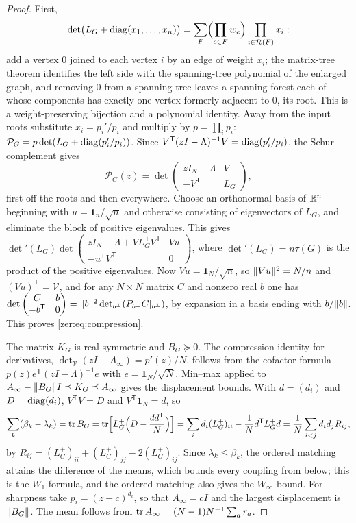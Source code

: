\begin{proof}
First,
\begin{equation}\label{zer:eq:forestdet}
 \det\bigl(L_G+\operatorname{diag}(x_1,\dots,x_n)\bigr)=\sum_F\Bigl(\prod_{e\in F}w_e\Bigr)\prod_{i\in\mathcal R(F)}x_i :
\end{equation}
add a vertex $0$ joined to each vertex $i$ by an edge of weight $x_i$; the matrix-tree theorem
identifies the left side with the spanning-tree polynomial of the enlarged graph, and removing $0$
from a spanning tree leaves a spanning forest each of whose components has exactly one vertex
formerly adjacent to $0$, its root. This is a weight-preserving bijection and a polynomial identity.
Away from the input roots substitute $x_i=p_i'/p_i$ and multiply by $p=\prod_ip_i$:
$\mathcal P_G=p\det(L_G+\operatorname{diag}(p_i'/p_i))$. Since $V^{\mathsf T}(zI-\Lambda)^{-1}V=\operatorname{diag}(p_i'/p_i)$,
the Schur complement gives
\[
 \mathcal P_G(z)=\det\begin{pmatrix}zI_N-\Lambda&V\\-V^{\mathsf T}&L_G\end{pmatrix},
\]
first off the roots and then everywhere. Choose an orthonormal basis of $\mathbb{R}^n$ beginning with
$u=\mathbf 1_n/\sqrt n$ and otherwise consisting of eigenvectors of $L_G$, and eliminate the block of
positive eigenvalues. This gives $\det{}'(L_G)\det\begin{pmatrix}zI_N-\Lambda+VL_G^+V^{\mathsf T}&Vu\\-u^{\mathsf T}V^{\mathsf T}&0\end{pmatrix}$,
where $\det{}'(L_G)=n\tau(G)$ is the product of the positive eigenvalues. Now $Vu=\mathbf 1_N/\sqrt n$,
so $\lVert Vu\rVert^2=N/n$ and $(Vu)^\perp=\mathcal V$, and for any $N\times N$ matrix $C$ and nonzero real
$b$ one has $\det\begin{pmatrix}C&b\\-b^{\mathsf T}&0\end{pmatrix}=\lVert b\rVert^2\det_{b^\perp}(P_{b^\perp}C|_{b^\perp})$, by
expansion in a basis ending with $b/\lVert b\rVert$. This proves \eqref{zer:eq:compression}.

The matrix $K_G$ is real symmetric and $B_G\succeq0$. The compression identity for derivatives,
$\det_{\mathcal V}(zI-A_\infty)=p'(z)/N$, follows from the cofactor formula
$p(z)e^{\mathsf T}(zI-\Lambda)^{-1}e$ with $e=\mathbf 1_N/\sqrt N$. Min--max applied to
$A_\infty-\lVert B_G\rVert I\preceq K_G\preceq A_\infty$ gives the displacement bounds. With
$d=(d_i)$ and $D=\operatorname{diag}(d_i)$, $V^{\mathsf T}V=D$ and $V^{\mathsf T}\mathbf 1_N=d$, so
\[
 \sum_k(\beta_k-\lambda_k)=\operatorname{tr} B_G=\operatorname{tr}\Bigl[L_G^+\Bigl(D-\frac{dd^{\mathsf T}}N\Bigr)\Bigr]
 =\sum_id_i(L_G^+)_{ii}-\frac1Nd^{\mathsf T}L_G^+d=\frac1N\sum_{i<j}d_id_jR_{ij},
\]
by $R_{ij}=(L_G^+)_{ii}+(L_G^+)_{jj}-2(L_G^+)_{ij}$. Since $\lambda_k\le\beta_k$, the ordered matching
attains the difference of the means, which bounds every coupling from below; this is the $W_1$
formula, and the ordered matching also gives the $W_\infty$ bound. For sharpness take
$p_i=(z-c)^{d_i}$, so that $A_\infty=cI$ and the largest displacement is $\lVert B_G\rVert$. The mean
follows from $\operatorname{tr} A_\infty=(N-1)N^{-1}\sum_ar_a$.
\end{proof}

